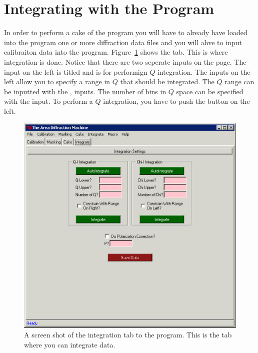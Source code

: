 \section{Integrating with the Program}


In order to perform a cake of the program you will have to 
already have loaded into the program one or more diffraction
data files and you will ahve to input calibraiton data
into the program. Figure~\ref{integration_page} shows the
 tab. This is where integration is done.
Notice that there are two seperate inputs on the page. 
The input on the left is titled 
and is for performign $Q$ integration.
The inputs on the left allow you to specify a
range in $Q$ that should be integrated.
The $Q$ range can be inputted with the
,  inputs. The number of
bins in $Q$ space can be specified with the
 input. 
To perform a $Q$ integration, you have to push
the  button on the left.

\begin{figure}
\centering
\includegraphics[scale=.75]{figures/integration_page.eps}
\caption{A screen shot of the integration tab to the 
    program. This is the tab where you can integrate data.} 
\label{integration_page}
\end{figure}

